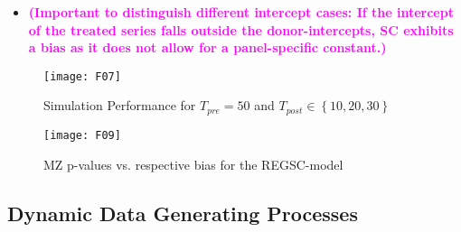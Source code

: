 \begin{itemize}
	\item \textcolor{magenta}{\textbf{(Important to distinguish different intercept cases: If the intercept of the treated series falls outside the donor-intercepts, SC exhibits a bias as it does not allow for a panel-specific constant.)}} 
\end{itemize}

\begin{figure}[H]
	\centering
	\texttt{[image: F07]}
	\caption{Simulation Performance for $T_{pre} = 50$ and $T_{post} \in \left\lbrace 10,20,30\right\rbrace$}
	\label{F_07}
\end{figure}

\begin{figure}[H]
	\centering
	\texttt{[image: F09]}
	\caption{\ac{MZ} p-values vs. respective bias for the REGSC-model}
	\label{F_08}
\end{figure}

\subsection{Dynamic Data Generating Processes}
